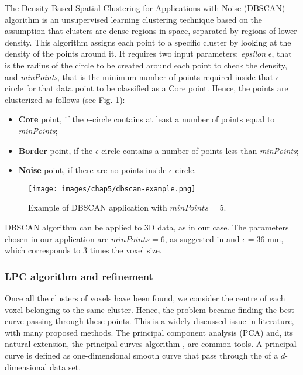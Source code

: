 The Density-Based Spatial Clustering for Applications with Noise (DBSCAN) algorithm \cite{DBSCAN} is an unsupervised learning clustering technique based on the assumption that clusters are dense regions in space, separated by regions of lower density. This algorithm assigns each point to a specific cluster by looking at the density of the points around it. It requires two input parameters: \textit{epsilon} $\epsilon$, that is the radius of the circle to be created around each point to check the density, and \textit{minPoints}, that is the minimum number of points required inside that $\epsilon$-circle for that data point to be classified as a Core point. 
Hence, the points are clusterized as follows (see Fig. \ref{fig:dbscan-example}):
\begin{itemize}
    \item \textbf{Core} point, if the $\epsilon$-circle contains at least a number of points equal to \textit{minPoints};
    \item \textbf{Border} point, if the $\epsilon$-circle contains a number of points less than \textit{minPoints};
    \item \textbf{Noise} point, if there are no points inside $\epsilon$-circle.
\end{itemize}

\begin{figure}
    \centering
    \texttt{[image: images/chap5/dbscan-example.png]}
    \caption{Example of DBSCAN application with $minPoints = 5$. \cite{dbscan-example}}
    \label{fig:dbscan-example}
\end{figure}

DBSCAN algorithm can be applied to 3D data, as in our case. The parameters chosen in our application are $minPoints = 6$, as suggested in \cite{dbscan-minPoints} and $\epsilon = 36 $ mm, which corresponds to 3 times the voxel size.

\subsubsection{LPC algorithm and refinement}
Once all the clusters of voxels have been found, we consider the centre of each voxel belonging to the same cluster. Hence, the problem became finding the best curve passing through these points. This is a widely-discussed issue in literature, with many proposed methods. The principal component analysis (PCA) \cite{PCA} and, its natural extension, the principal curves algorithm \cite{princ-curvesHS}, are common tools.
A principal curve is defined as one-dimensional smooth curve that pass through the  of a $d$-dimensional data set.


